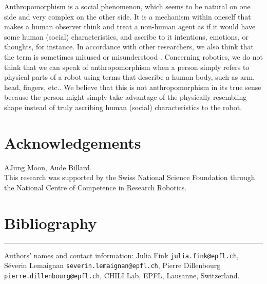 \documentclass[lettersize, apacite, twoside, HRI]{apa_HRI}
\begin{document}
	Anthropomorphism is a social phenomenon, which seems to be natural on one side and very complex on the other side. It is a mechanism within oneself that makes a human observer think and treat a non-human agent as if it would have some human (social) characteristics, and ascribe to it intentions, emotions, or thoughts, for instance. In accordance with other researchers, we also think that the term is sometimes misused or misunderstood \cite{duffy_anthropomorphism_2002}. Concerning robotics, we do not think that we can speak of anthropomorphism when a person simply refers to physical parts of a robot using terms that describe a human body, such as arm, head, fingers, etc.. We believe that this is not anthropomorphism in its true sense because the person might simply take advantage of the physically resembling shape instead of truly ascribing human (social) characteristics to the robot.



\section*{Acknowledgements}
AJung Moon, Aude Billard.\\

This research was supported by the Swiss National Science Foundation through
the National Centre of Competence in Research Robotics.

\section{Bibliography}

\hrule

\vspace*{.1in}
Authors' names and contact information: Julia Fink {\tt julia.fink@epfl.ch}, Séverin Lemaignan {\tt severin.lemaignan@epfl.ch}, Pierre Dillenbourg {\tt pierre.dillenbourg@epfl.ch}, CHILI Lab, EPFL, Lausanne, Switzerland.
\end{document}
